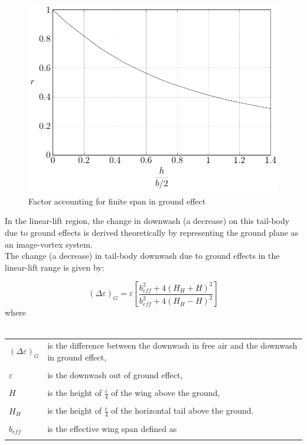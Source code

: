 \begin{figure}[H]
	\centering
	\includegraphics[height=8.5cm, keepaspectratio ]{Immagini/Capitolo2/2_9-Delta_alpha_G_r_vs_2hfracb} 
	\caption{Factor accounting for finite span in ground effect} %
	\label{fig:figura2_9} %
\end{figure}

In the linear-lift region, the change in downwash (a decrease) on this tail-body due to ground effects
is derived theoretically by representing the ground plane as an image-vortex system.\\
The change (a decrease) in tail-body downwash due to ground effects in the linear-lift range is given by:

\begin{equation}
\left(\Delta \varepsilon \right)_G=\varepsilon \left[\frac{b_{eff}^2+4\left(H_H+H\right)^2}{b_{eff}^2+4\left(H_H-H\right)^2}\right]
\label{eq:equazione2_2} %
\end{equation}
where \\ \\

\begin{tabulary}{1\textwidth}{L L}
\begin{minipage}[T]{3cm}$\left(\Delta \varepsilon \right)_G$  \end{minipage}& is the difference between the downwash in free air and the downwash in
ground effect,\\ \\
$\varepsilon$ & is the downwash out of ground effect, \\ \\
$H$ & is the height of $\frac{\overline c}{4}$ of the wing above the ground, \\ \\
$H_H$ & is the height of $\frac{\overline c}{4}$ of the horizontal tail above the ground.\\ \\
$b_{eff}$ & is the effective wing span defined as\\ \\
\end{tabulary}


